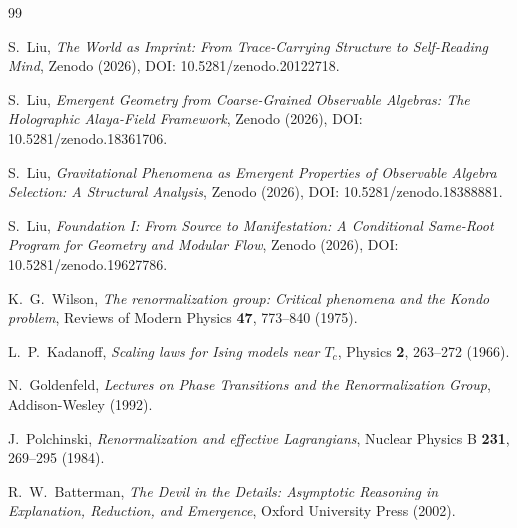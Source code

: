 \documentclass[12pt]{article}
\begin{document}
\begin{thebibliography}{99}

S.~Liu,
\emph{The World as Imprint: From Trace-Carrying Structure to Self-Reading Mind},
Zenodo (2026), DOI: 10.5281/zenodo.20122718.

S.~Liu,
\emph{Emergent Geometry from Coarse-Grained Observable Algebras: The Holographic Alaya-Field Framework},
Zenodo (2026), DOI: 10.5281/zenodo.18361706.

S.~Liu,
\emph{Gravitational Phenomena as Emergent Properties of Observable Algebra Selection: A Structural Analysis},
Zenodo (2026), DOI: 10.5281/zenodo.18388881.

S.~Liu,
\emph{Foundation I: From Source to Manifestation: A Conditional Same-Root Program for Geometry and Modular Flow},
Zenodo (2026), DOI: 10.5281/zenodo.19627786.

K.~G.~Wilson,
\emph{The renormalization group: Critical phenomena and the Kondo problem},
Reviews of Modern Physics \textbf{47}, 773--840 (1975).

L.~P.~Kadanoff,
\emph{Scaling laws for Ising models near $T_c$},
Physics \textbf{2}, 263--272 (1966).

N.~Goldenfeld,
\emph{Lectures on Phase Transitions and the Renormalization Group},
Addison-Wesley (1992).

J.~Polchinski,
\emph{Renormalization and effective Lagrangians},
Nuclear Physics B \textbf{231}, 269--295 (1984).

R.~W.~Batterman,
\emph{The Devil in the Details: Asymptotic Reasoning in Explanation, Reduction, and Emergence},
Oxford University Press (2002).

\end{thebibliography}
\end{document}
